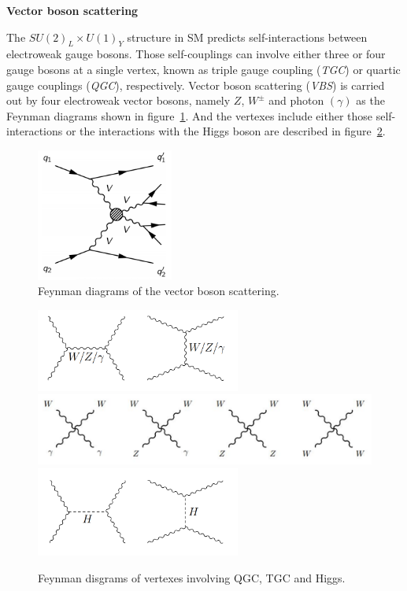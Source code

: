 \textbf{Vector boson scattering}

The $SU(2)_{L} \times U(1)_{Y}$ structure in SM predicts self-interactions between electroweak gauge bosons.
Those self-couplings can involve either three or four gauge bosons at a single vertex, known as triple gauge coupling (\textit{TGC}) or
quartic gauge couplings (\textit{QGC}), respectively.
Vector boson scattering (\textit{VBS}) is carried out 
by four electroweak vector bosons, namely $Z$, $W^{\pm}$ and photon $(\gamma)$ as the Feynman diagrams shown in figure~\ref{fig:vbs_fd1}. 
And the vertexes include either those self-interactions
or the interactions with the Higgs boson are described in figure~\ref{fig:vbs_fd2}.
\begin{figure}[!htb]
  \centering
  \includegraphics[width=0.4\textwidth]{figures/Theory/VBS.png} 
  \caption{Feynman diagrams of the vector boson scattering.}
  \label{fig:vbs_fd1}
\end{figure}
\begin{figure}[!htb]
  \centering
  \includegraphics[width=0.6\textwidth]{figures/Theory/vbs_tgc.png} \\
  \includegraphics[width=1.0\textwidth]{figures/Theory/vbs_qgc.png} \\
  \includegraphics[width=0.6\textwidth]{figures/Theory/vbs_higgs.png} 
  \caption{Feynman disgrams of vertexes involving QGC, TGC and Higgs.}
  \label{fig:vbs_fd2}
\end{figure}

